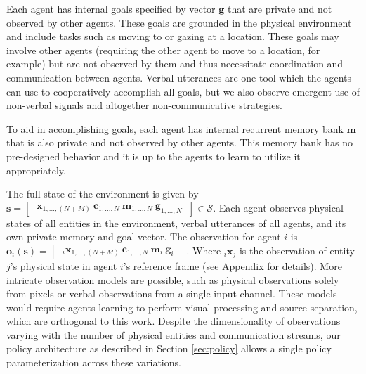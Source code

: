 \documentclass[letterpaper]{article} %
\begin{document}
Each agent has internal goals specified by vector $\mathbf{g}$ that are private and not observed by other agents. These goals are grounded in the physical environment and include tasks such as moving to or gazing at a location. These goals may involve other agents (requiring the other agent to move to a location, for example) but are not observed by them and thus necessitate coordination and communication between agents. Verbal utterances are one tool which the agents can use to cooperatively accomplish all goals, but we also observe emergent use of non-verbal signals and altogether non-communicative strategies.

To aid in accomplishing goals, each agent has internal recurrent memory bank $\mathbf{m}$ that is also private and not observed by other agents. This memory bank has no pre-designed behavior and it is up to the agents to learn to utilize it appropriately. %

The full state of the environment is given by
$
    \mathbf{s} = \begin{bmatrix} \ \mathbf{x}_{1,...,(N+M)} \ \mathbf{c}_{1,...,N} \ \mathbf{m}_{1,...,N} \ \mathbf{g}_{1,...,N} \ \end{bmatrix} \in \mathcal{S}.
$
Each agent observes physical states of all entities in the environment, verbal utterances of all agents, and its own private memory and goal vector. The observation for agent $i$ is
$
    \mathbf{o}_i(\mathbf{s}) = \begin{bmatrix} \ _i\mathbf{x}_{1,...,(N+M)} \ \mathbf{c}_{1,...,N} \ \mathbf{m}_i \ \mathbf{g}_i \ \end{bmatrix}.
$
Where $_i\mathbf{x}_j$ is the observation of entity $j$'s physical state in agent $i$'s reference frame (see Appendix for details).
More intricate observation models are possible, such as physical observations solely from pixels or verbal observations from a single input channel. These models would require agents learning to perform visual processing and source separation, which are orthogonal to this work. Despite the dimensionality of observations varying with the number of physical entities and communication streams, our policy architecture as described in Section \ref{sec:policy} allows a single policy parameterization across these variations.
\end{document}
